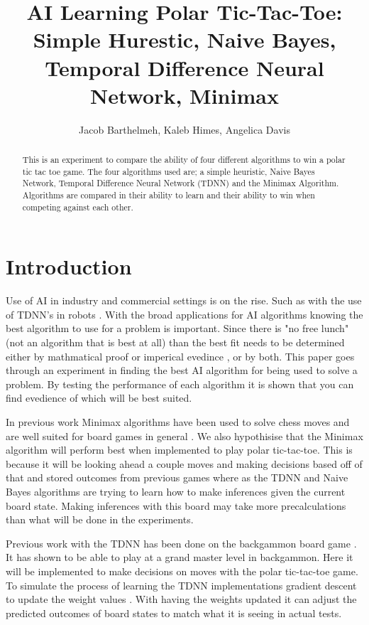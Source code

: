 \documentclass[12pt,letterpaper]{article}
\title{AI Learning Polar Tic-Tac-Toe: \\ Simple Hurestic, Naive Bayes, Temporal Difference Neural Network, Minimax}
\author{Jacob Barthelmeh, Kaleb Himes, Angelica Davis}
\begin{document}
\maketitle

\begin{abstract}
This is an experiment to compare the ability of four different algorithms to win a polar tic tac toe game. The four algorithms used are; a simple heuristic, Naive Bayes Network, Temporal Difference Neural Network (TDNN) and the Minimax Algorithm. Algorithms are compared in their ability to learn and their ability to win when competing against each other.
\end{abstract}

\section{Introduction}
Use of AI in industry and commercial settings is on the rise. Such as with the use of TDNN's in robots \cite{robotTDNN}. With the broad applications for AI algorithms knowing the best algorithm to use for a problem is important. Since there is "no free lunch" (not an algorithm that is best at all) than the best fit needs to be determined either by mathmatical proof or imperical evedince , or by both. This paper goes through an experiment in finding the best AI algorithm for being used to solve a problem. By testing the performance of each algorithm it is shown that you can find evedience of which will be best suited.
 
In previous work Minimax algorithms have been used to solve chess moves and are well suited for board games in general \cite{flyingMinimax}. We also hypothisise that the Minimax algorithm will perform best when implemented to play polar tic-tac-toe. This is because it will be looking ahead a couple moves and making decisions based off of that and stored outcomes from previous games where as the TDNN and Naive Bayes algorithms are trying to learn how to make inferences given the current board state. Making inferences with this board may take more precalculations than what will be done in the experiments.

Previous work with the TDNN has been done on the backgammon board game \cite{stanfordTDNN}. It has shown to be able to play at a grand master level in backgammon. Here it will be implemented to make decisions on moves with the polar tic-tac-toe game. To simulate the process of learning the TDNN implementations gradient descent to update the weight values \cite{gradientTDNN}. With having the weights updated it can adjust the predicted outcomes of board states to match what it is seeing in actual tests. 
\end{document}
